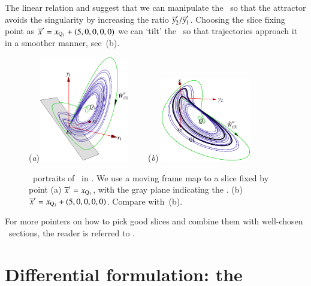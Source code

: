 \documentclass[final,number,sort&compress]{elsarticle}
\begin{document}
The linear relation  and
 suggest that we can manipulate the
\sset\ so that the attractor avoids the singularity by
increasing the ratio ${\overline{y}'_{2}}/{\overline{y}'_{1}}$.
Choosing the slice fixing point as
${\overline{x}'}=x_{\mathrm{Q}_{1}}+(5,0,0,0,0)$
we can `tilt' the \sset\ so that trajectories approach it in a
smoother manner, see \,(b).
\begin{figure}[ht]
\begin{center}
  (\textit{a})\includegraphics[width=0.35\textwidth,clip=true]{CLEmfReqb234}
~~~~(\textit{b})%
\includegraphics[width=0.35\textwidth,clip=true]{CLEmfAdHoc245}
\end{center}
\caption{
\Statesp\ portraits of \cLf\ in \reducedsp. We use a
moving frame map to a slice fixed by point
(a) ${\overline{x}'}  = x_{\mathrm{Q}_{1}}$, with
the gray plane indicating the \sset.
(b) ${\overline{x}'}  = x_{\mathrm{Q}_{1}}+(5,0,0,0,0)$. Compare with \,(b).
    }\label{fig:CLEmfsset}
\end{figure}
%

For more pointers on how to pick good slices and combine them
with well-chosen \Poincare\ sections, the reader is referred to
.

\section{\label{sec:MovFrameODE}Differential formulation: the \mslices}
\end{document}
